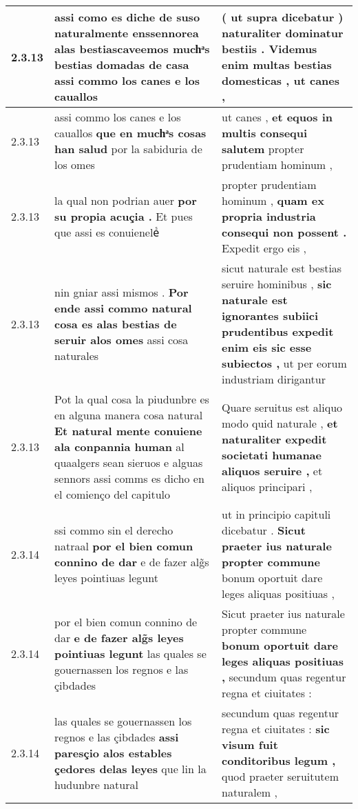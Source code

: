 \begin{tabular}{|p{1cm}|p{6.5cm}|p{6.5cm}|}
2.3.13 & assi como es diche de suso naturalmente enssennorea \textbf{ alas bestiascaveemos muchͣs bestias domadas de casa } assi commo los canes e los cauallos & ( \textbf{ ut supra dicebatur ) naturaliter dominatur bestiis . Videmus enim multas bestias domesticas , } ut canes , \\\hline
2.3.13 & assi commo los canes e los cauallos \textbf{ que en muchͣs cosas han salud } por la sabiduria de los omes & ut canes , \textbf{ et equos in multis consequi salutem } propter prudentiam hominum , \\\hline
2.3.13 & la qual non podrian auer \textbf{ por su propia acuçia . } Et pues que assi es conuieneleᷤ & propter prudentiam hominum , \textbf{ quam ex propria industria consequi non possent . } Expedit ergo eis , \\\hline
2.3.13 & nin gniar assi mismos . \textbf{ Por ende assi commo natural cosa es alas bestias de seruir alos omes } assi cosa naturales & sicut naturale est bestias seruire hominibus , \textbf{ sic naturale est ignorantes subiici prudentibus expedit enim eis sic esse subiectos , } ut per eorum industriam dirigantur \\\hline
2.3.13 & Pot la qual cosa la piudunbre es en alguna manera cosa natural \textbf{ Et natural mente conuiene ala conpannia human } al quaalgers sean sieruos e alguas sennors assi comms es dicho en el comienço del capitulo & Quare seruitus est aliquo modo quid naturale , \textbf{ et naturaliter expedit societati humanae aliquos seruire , } et aliquos principari , \\\hline
2.3.14 & ssi commo sin el derecho natraal \textbf{ por el bien comun connino de dar } e de fazer alg̃s leyes pointiuas legunt & ut in principio capituli dicebatur . \textbf{ Sicut praeter ius naturale propter commune } bonum oportuit dare leges aliquas positiuas , \\\hline
2.3.14 & por el bien comun connino de dar \textbf{ e de fazer alg̃s leyes pointiuas legunt } las quales se gouernassen los regnos e las çibdades & Sicut praeter ius naturale propter commune \textbf{ bonum oportuit dare leges aliquas positiuas , } secundum quas regentur regna et ciuitates : \\\hline
2.3.14 & las quales se gouernassen los regnos e las çibdades \textbf{ assi paresçio alos estables çedores delas leyes } que lin la hudunbre natural & secundum quas regentur regna et ciuitates : \textbf{ sic visum fuit conditoribus legum , } quod praeter seruitutem naturalem , \\\hline

\end{tabular}
